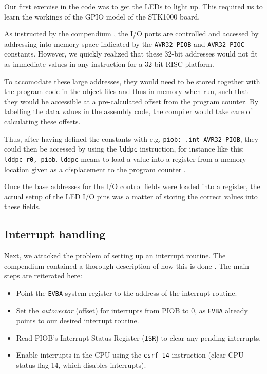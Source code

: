 Our first exercise in the code was to get the LEDs to light up. This
required us to learn the workings of the GPIO model of the STK1000
board.

As instructed by the compendium \cite{comp}, the I/O ports are controlled
and accessed by addressing into memory space indicated by the
\texttt{AVR32\_PIOB} and \texttt{AVR32\_PIOC} constants. However, we
quickly realized that these 32-bit addresses would not fit as immediate
values in any instruction for a 32-bit RISC platform.

To accomodate these large addresses, they would need to be stored
together with the program code in the object files and thus in memory
when run, such that they would be accessible at a pre-calculated offset
from the program counter. By labelling the data values in the assembly
code, the compiler would take care of calculating these offsets.

Thus, after having defined the constants with e.g. \texttt{piob: .int
AVR32\_PIOB}, they could then be accessed by using the \texttt{lddpc}
instruction, for instance like this: \texttt{lddpc r0, piob}.
\texttt{lddpc} means to load a value into a register from a memory
location given as a displacement to the program counter \cite{avr32}.

Once the base addresses for the I/O control fields were loaded into a
register, the actual setup of the LED I/O pins was a matter of storing
the correct values into these fields.

\subsection{Interrupt handling}

Next, we attacked the problem of setting up an interrupt routine. The
compendium contained a thorough description of how this is done
\cite{comp}. The main steps are reiterated here:

\begin{itemize}
    \item Point the \texttt{EVBA} system register to the address of the
    interrupt routine.
    \item Set the \emph{autovector} (offset) for interrupts from PIOB to
    0, as \texttt{EVBA} already points to our desired interrupt routine.
    \item Read PIOB's Interrupt Status Register (\texttt{ISR}) to clear
    any pending interrupts.
    \item Enable interrupts in the CPU using the \texttt{csrf 14}
    instruction (clear CPU status flag 14, which disables interrupts).
\end{itemize}

